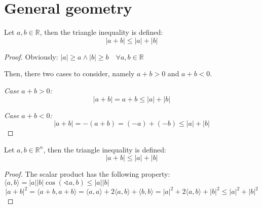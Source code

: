 \chapter{General geometry}

\begin{theorem}
    Let $a, b \in \mathbb{R}$, then the triangle inequality is defined:
    \begin{equation}
        |a + b| \le |a| + |b|
    \end{equation}
\end{theorem}
\begin{proof}
    Obviously: $|a| \ge a \wedge |b| \ge b \quad \forall a, b \in \mathbb{R}$
    
    Then, there two cases to consider, namely $a+b>0$ and $a+b<0$.

    \emph{Case $a+b>0$:}
    \begin{equation}
        |a + b| = a + b \le |a| + |b|
    \end{equation}

    \emph{Case $a+b<0$:}
    \begin{equation}
        |a + b| = -(a + b) = (-a) + (-b) \le |a| + |b|
    \end{equation}
\end{proof}

\begin{theorem}
    Let $a, b \in \mathbb{R}^n$, then the triangle inequality is defined:
    \begin{equation}
        |a + b| \le |a| + |b|
    \end{equation}
\end{theorem}
\begin{proof}
    The scalar product has the following property: $\langle a,b \rangle = |a||b|\cos(\sphericalangle a,b) \le |a||b|$
    \begin{equation}
        |a + b|^2 = \langle a+b,a+b \rangle 
                  = \langle a,a \rangle + 2 \langle a,b \rangle + \langle b,b \rangle
                  = |a|^2 + 2 \langle a,b \rangle + |b|^2
                  \le |a|^2 + |b|^2
    \end{equation}
\end{proof}
